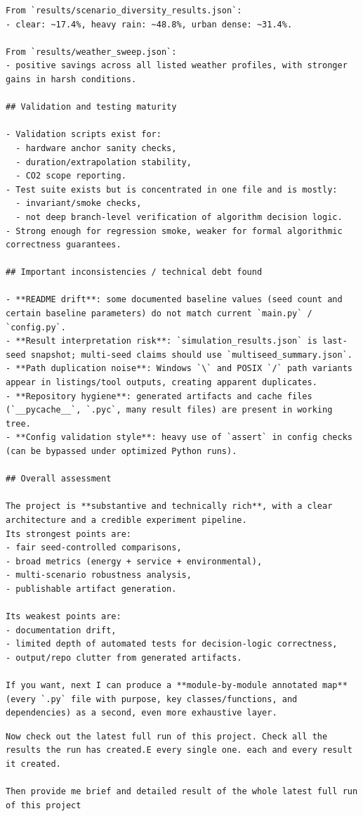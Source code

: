\documentclass[11pt,a4paper]{article}
\newenvironment{userbox}
  {\begin{tcolorbox}[
    breakable,
    colback=UserBG,
    colframe=UserBorder,
    title=Source Request Extract,
    fonttitle=\bfseries\small\color{white},
    coltitle=white,
    colbacktitle=UserBorder,
    boxrule=0.5pt,
    arc=1.2mm,
    left=1.4mm,right=1.4mm,top=0.8mm,bottom=0.8mm,
    boxsep=0.6mm,
    before skip=0pt,
    after skip=0pt
  ]}
  {\end{tcolorbox}}
\newenvironment{assistantbox}
  {\begin{tcolorbox}[
    breakable,
    colback=AsstBG,
    colframe=AsstBorder,
    title=Project Overview Extract,
    fonttitle=\bfseries\small\color{white},
    coltitle=white,
    colbacktitle=AsstBorder,
    boxrule=0.5pt,
    arc=1.2mm,
    left=1.4mm,right=1.4mm,top=0.8mm,bottom=0.8mm,
    boxsep=0.6mm,
    before skip=0pt,
    after skip=0pt
  ]}
  {\end{tcolorbox}}
\begin{document}
\begin{assistantbox}
\begin{Verbatim}[breaklines=true,breakanywhere=true]
From `results/scenario_diversity_results.json`:
- clear: ~17.4%, heavy rain: ~48.8%, urban dense: ~31.4%.

From `results/weather_sweep.json`:
- positive savings across all listed weather profiles, with stronger gains in harsh conditions.

## Validation and testing maturity

- Validation scripts exist for:
  - hardware anchor sanity checks,
  - duration/extrapolation stability,
  - CO2 scope reporting.
- Test suite exists but is concentrated in one file and is mostly:
  - invariant/smoke checks,
  - not deep branch-level verification of algorithm decision logic.
- Strong enough for regression smoke, weaker for formal algorithmic correctness guarantees.

## Important inconsistencies / technical debt found

- **README drift**: some documented baseline values (seed count and certain baseline parameters) do not match current `main.py` / `config.py`.
- **Result interpretation risk**: `simulation_results.json` is last-seed snapshot; multi-seed claims should use `multiseed_summary.json`.
- **Path duplication noise**: Windows `\` and POSIX `/` path variants appear in listings/tool outputs, creating apparent duplicates.
- **Repository hygiene**: generated artifacts and cache files (`__pycache__`, `.pyc`, many result files) are present in working tree.
- **Config validation style**: heavy use of `assert` in config checks (can be bypassed under optimized Python runs).

## Overall assessment

The project is **substantive and technically rich**, with a clear architecture and a credible experiment pipeline.  
Its strongest points are:
- fair seed-controlled comparisons,
- broad metrics (energy + service + environmental),
- multi-scenario robustness analysis,
- publishable artifact generation.

Its weakest points are:
- documentation drift,
- limited depth of automated tests for decision-logic correctness,
- output/repo clutter from generated artifacts.

If you want, next I can produce a **module-by-module annotated map** (every `.py` file with purpose, key classes/functions, and dependencies) as a second, even more exhaustive layer.
\end{Verbatim}
\end{assistantbox}

\begin{userbox}
\begin{Verbatim}[breaklines=true,breakanywhere=true]
Now check out the latest full run of this project. Check all the results the run has created.E every single one. each and every result it created.

Then provide me brief and detailed result of the whole latest full run of this project
\end{Verbatim}
\end{userbox}
\end{document}
